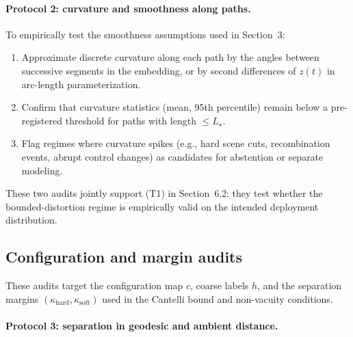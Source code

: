 \documentclass[11pt]{article}
\begin{document}
\paragraph{Protocol 2: curvature and smoothness along paths.}

To empirically test the smoothness assumptions used in Section~3:

\begin{enumerate}[label=(\arabic*)]
\item Approximate discrete curvature along each path by the angles between
  successive segments in the embedding, or by second differences of $z(t)$
  in arc-length parameterization.
\item Confirm that curvature statistics (mean, 95th percentile) remain below
  a pre-registered threshold for paths with length $\le L_\star$.
\item Flag regimes where curvature spikes (e.g., hard scene cuts, recombination
  events, abrupt control changes) as candidates for abstention or separate
  modeling.
\end{enumerate}

These two audits jointly support (T1) in Section~6.2: they test whether the
bounded-distortion regime is empirically valid on the intended deployment
distribution.

\subsection{Configuration and margin audits}

These audits target the configuration map $c$, coarse labels $h$, and the
separation margins $(\kappa_{\mathrm{hard}},\kappa_{\mathrm{soft}})$ used in
the Cantelli bound and non-vacuity conditions.

\paragraph{Protocol 3: separation in geodesic and ambient distance.}
\end{document}

